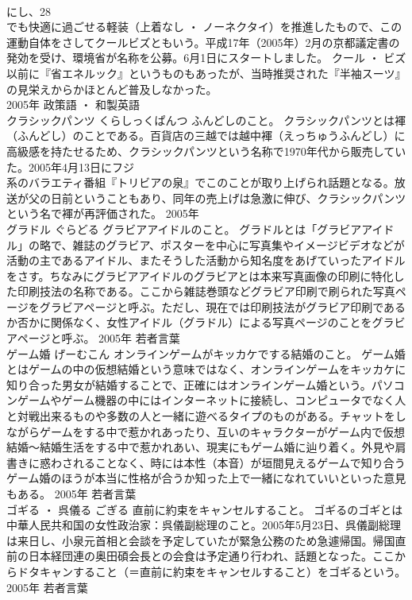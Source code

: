 \documentclass[8pt]{extreport}
\begin{document}
\begin{CJK}{UTF8}{min}
\\	にし、28
\\	でも快適に過ごせる軽装（上着なし ・ ノーネクタイ）を推進したもので、この運動自体をさしてクールビズともいう。平成17年（2005年）2月の京都議定書の発効を受け、環境省が名称を公募。6月1日にスタートしました。 クール ・ ビズ以前に『省エネルック』というものもあったが、当時推奨された『半袖スーツ』の見栄えからかほとんど普及しなかった。
\\	2005年	政策語 ・ 和製英語	
\\	クラシックパンツ	くらしっくぱんつ	ふんどしのこと。	クラシックパンツとは褌（ふんどし）のことである。百貨店の三越では越中褌（えっちゅうふんどし）に高級感を持たせるため、クラシックパンツという名称で1970年代から販売していた。2005年4月13日にフジ
\\	系のバラエティ番組『トリビアの泉』でこのことが取り上げられ話題となる。放送が父の日前ということもあり、同年の売上げは急激に伸び、クラシックパンツという名で褌が再評価された。	2005年	
\\	グラドル	ぐらどる	グラビアアイドルのこと。	グラドルとは「グラビアアイドル」の略で、雑誌のグラビア、ポスターを中心に写真集やイメージビデオなどが活動の主であるアイドル、またそうした活動から知名度をあげていったアイドルをさす。ちなみにグラビアアイドルのグラビアとは本来写真画像の印刷に特化した印刷技法の名称である。ここから雑誌巻頭などグラビア印刷で刷られた写真ページをグラビアページと呼ぶ。ただし、現在では印刷技法がグラビア印刷であるか否かに関係なく、女性アイドル（グラドル）による写真ページのことをグラビアページと呼ぶ。	2005年	若者言葉	
\\	ゲーム婚	げーむこん	オンラインゲームがキッカケでする結婚のこと。	ゲーム婚とはゲームの中の仮想結婚という意味ではなく、オンラインゲームをキッカケに知り合った男女が結婚することで、正確にはオンラインゲーム婚という。パソコンゲームやゲーム機器の中にはインターネットに接続し、コンピュータでなく人と対戦出来るものや多数の人と一緒に遊べるタイプのものがある。チャットをしながらゲームをする中で惹かれあったり、互いのキャラクターがゲーム内で仮想結婚～結婚生活をする中で惹かれあい、現実にもゲーム婚に辿り着く。外見や肩書きに惑わされることなく、時には本性（本音）が垣間見えるゲームで知り合うゲーム婚のほうが本当に性格が合うか知った上で一緒になれていいといった意見もある。	2005年	若者言葉	
\\	ゴギる ・ 呉儀る	ごぎる	直前に約束をキャンセルすること。	ゴギるのゴギとは中華人民共和国の女性政治家：呉儀副総理のこと。2005年5月23日、呉儀副総理は来日し、小泉元首相と会談を予定していたが緊急公務のため急遽帰国。帰国直前の日本経団連の奥田碩会長との会食は予定通り行われ、話題となった。ここからドタキャンすること（＝直前に約束をキャンセルすること）をゴギるという。	2005年	若者言葉	

\end{CJK}
\end{document}
